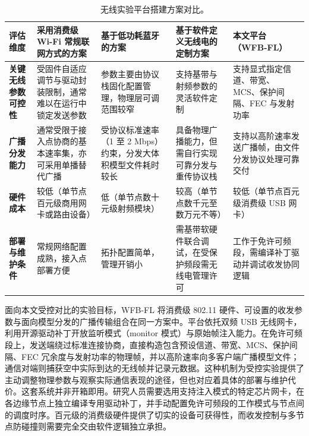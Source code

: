 \begin{table}[tb]
\caption{无线实验平台搭建方案对比。}
\label{tab:1}
\centering
\small
\renewcommand{\arraystretch}{1.25}
\setlength{\tabcolsep}{5pt}
\begin{tabularx}{\textwidth}{@{}>{\raggedright\arraybackslash}p{}YYYY@{}}
\toprule
\textbf{评估维度} & \textbf{采用消费级 Wi-Fi 常规联网方式的方案} & \textbf{基于低功耗蓝牙的方案} & \textbf{基于软件定义无线电的定制方案} & \textbf{本文平台（WFB-FL）} \\
\midrule
\textbf{关键无线参数可控性} & 受固件自适应调节与驱动封装限制，通常难以在运行中锁定发送参数 & 参数主要由协议栈固化配置管理，物理层可调范围较窄 & 支持基带与射频参数的灵活软件定制 & 支持显式指定信道、带宽、MCS、保护间隔、FEC 与发射功率 \\
\textbf{广播分发能力} & 通常受限于接入点协商的基本速率集，亦可采用单播替代广播 & 受协议标准速率（1 至 2 Mbps）约束，分发大体积模型文件耗时较长 & 具备物理广播能力，但需自行实现可靠分发与重传协议栈 & 支持以高阶速率发送广播帧，由文件分发协议处理可靠交付 \\
\textbf{硬件成本} & 较低（单节点百元级商用网卡或路由设备） & 低（单节点数十元级射频模块） & 较高（单节点数千元至数万元不等） & 较低（单节点百元级消费级 USB 网卡） \\
\textbf{部署与维护条件} & 常规网络配置成熟，接入点部署方便 & 拓扑配置简单，管理开销小 & 需基带软硬件联合调试，在受保护频段需无线电管理许可 & 工作于免许可频段，需编译补丁驱动并调试收发协同逻辑 \\
\bottomrule
\end{tabularx}
\end{table}

面向本文受控对比的实验目标，WFB-FL 将消费级 802.11 硬件、可设置的收发参数与面向模型分发的广播传输组合在同一方案中。平台依托双频 USB 无线网卡，利用开源驱动补丁开放监听模式（monitor 模式）与原始帧注入能力。在免许可频段上，发送端绕过标准连接协商，直接构造包含预设信道、带宽、MCS、保护间隔、FEC 冗余度与发射功率的物理帧，并以高阶速率向多客户端广播模型文件；通信对端则捕获空中实际到达的无线帧并记录元数据。这种机制为受控实验提供了主动调整物理参数与观察实际通信表现的途径，但也对应着具体的部署与维护代价。这套系统并非开箱即用。研究人员需要选用支持注入模式的特定芯片网卡，在各边缘节点上独立编译专用驱动补丁，并手动配置免许可频段的工作模式与节点间的调度时序。百元级的消费级硬件提供了切实的设备可获得性，而收发控制与多节点防碰撞则需要完全交由软件逻辑独立承担。
